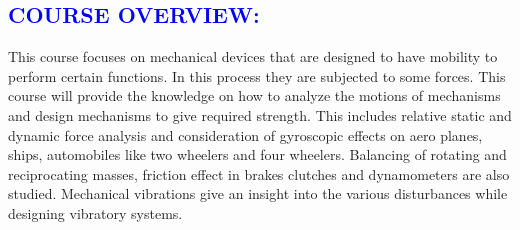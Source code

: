 \documentclass[11pt]{exam}
\begin{document}
\textcolor{blue}{\section{\large \bfseries COURSE OVERVIEW:}}
This course focuses on mechanical devices that are designed to have mobility to perform certain functions. In this
process they are subjected to some forces. This course will provide the knowledge on how to analyze the motions of
mechanisms and design mechanisms to give required strength. This includes relative static and dynamic force analysis
and consideration of gyroscopic effects on aero planes, ships, automobiles like two wheelers and four wheelers.
Balancing of rotating and reciprocating masses, friction effect in brakes clutches and dynamometers are also studied.
Mechanical vibrations give an insight into the various disturbances while designing vibratory systems.
\end{document}
